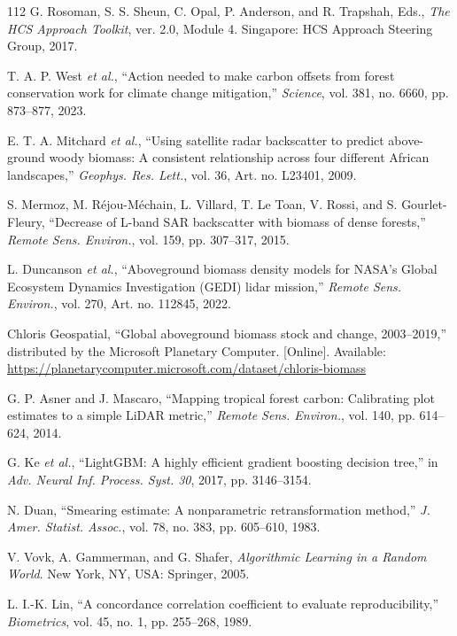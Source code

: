 \documentclass[conference,a4paper]{IEEEtran}
\begin{document}
\begin{thebibliography}{112}
G. Rosoman, S. S. Sheun, C. Opal, P. Anderson, and R. Trapshah, Eds., \textit{The HCS Approach Toolkit}, ver. 2.0, Module 4. Singapore: HCS Approach Steering Group, 2017.

T. A. P. West \textit{et al.}, ``Action needed to make carbon offsets from forest conservation work for climate change mitigation,'' \textit{Science}, vol. 381, no. 6660, pp. 873--877, 2023.

E. T. A. Mitchard \textit{et al.}, ``Using satellite radar backscatter to predict above-ground woody biomass: A consistent relationship across four different African landscapes,'' \textit{Geophys. Res. Lett.}, vol. 36, Art. no. L23401, 2009.

S. Mermoz, M. R\'ejou-M\'echain, L. Villard, T. Le Toan, V. Rossi, and S. Gourlet-Fleury, ``Decrease of L-band SAR backscatter with biomass of dense forests,'' \textit{Remote Sens. Environ.}, vol. 159, pp. 307--317, 2015.

L. Duncanson \textit{et al.}, ``Aboveground biomass density models for NASA's Global Ecosystem Dynamics Investigation (GEDI) lidar mission,'' \textit{Remote Sens. Environ.}, vol. 270, Art. no. 112845, 2022.

Chloris Geospatial, ``Global aboveground biomass stock and change, 2003--2019,'' distributed by the Microsoft Planetary Computer. [Online]. Available: \url{https://planetarycomputer.microsoft.com/dataset/chloris-biomass}

G. P. Asner and J. Mascaro, ``Mapping tropical forest carbon: Calibrating plot estimates to a simple LiDAR metric,'' \textit{Remote Sens. Environ.}, vol. 140, pp. 614--624, 2014.

G. Ke \textit{et al.}, ``LightGBM: A highly efficient gradient boosting decision tree,'' in \textit{Adv. Neural Inf. Process. Syst. 30}, 2017, pp. 3146--3154.

N. Duan, ``Smearing estimate: A nonparametric retransformation method,'' \textit{J. Amer. Statist. Assoc.}, vol. 78, no. 383, pp. 605--610, 1983.

V. Vovk, A. Gammerman, and G. Shafer, \textit{Algorithmic Learning in a Random World}. New York, NY, USA: Springer, 2005.

L. I.-K. Lin, ``A concordance correlation coefficient to evaluate reproducibility,'' \textit{Biometrics}, vol. 45, no. 1, pp. 255--268, 1989.


\end{thebibliography}
\end{document}
